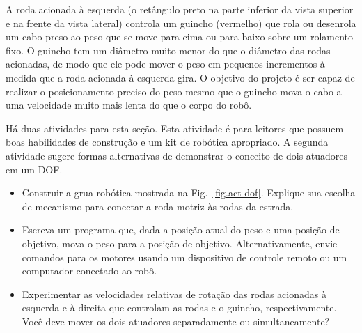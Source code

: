 {A roda acionada à esquerda (o retângulo preto na parte inferior da vista superior e na frente da vista lateral) controla um guincho (vermelho) que rola ou desenrola um cabo preso ao peso que se move para cima ou para baixo sobre um rolamento fixo. O guincho tem um diâmetro muito menor do que o diâmetro das rodas acionadas, de modo que ele pode mover o peso em pequenos incrementos à medida que a roda acionada à esquerda gira. O objetivo do projeto é ser capaz de realizar o posicionamento preciso do peso mesmo que o guincho mova o cabo a uma velocidade muito mais lenta do que o corpo do robô.

Há duas atividades para esta seção. Esta atividade é para leitores que possuem boas habilidades de construção e um kit de robótica apropriado. A segunda atividade sugere formas alternativas de demonstrar o conceito de dois atuadores em um DOF.

\begin{framed}
\begin{itemize}
\item Construir a grua robótica mostrada na Fig.~\ref{fig.act-dof}. Explique sua escolha de mecanismo para conectar a roda motriz às rodas da estrada.
\item Escreva um programa que, dada a posição atual do peso e uma posição de objetivo, mova o peso para a posição de objetivo. Alternativamente, envie comandos para os motores usando um dispositivo de controle remoto ou um computador conectado ao robô.
\item Experimentar as velocidades relativas de rotação das rodas acionadas à esquerda e à direita que controlam as rodas e o guincho, respectivamente. Você deve mover os dois atuadores separadamente ou simultaneamente?
\end{itemize}
\end{framed}

}
